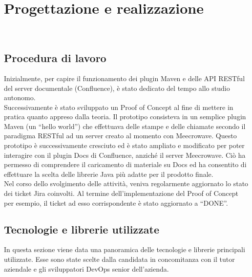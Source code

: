 
\chapter{Progettazione e realizzazione}
\label{cap:progettazione}

\\

\section{Procedura di lavoro}
Inizialmente, per capire il funzionamento dei plugin Maven e delle API RESTful del server documentale (Confluence), è stato dedicato del tempo allo studio autonomo. \\
Successivamente è stato sviluppato un Proof of Concept al fine di mettere in pratica quanto appreso dalla teoria. 
Il prototipo consisteva in un semplice plugin Maven (un ``hello world'') che effettuava delle stampe e delle chiamate secondo il paradigma RESTful ad un server creato al momento con Meecrowave.
Questo prototipo è successivamente cresciuto ed è stato ampliato e modificato per poter interagire con il plugin Docs di Confluence, anziché il server Meecrowave.
Ciò ha permesso di comprendere il caricamento di materiale su Docs ed ha consentito di effettuare la scelta delle librerie Java più adatte per il prodotto finale. \\
Nel corso dello svolgimento delle attività, veniva regolarmente aggiornato lo stato dei ticket Jira coinvolti.
Al termine dell'implementazione del Proof of Concept per esempio, il ticket ad esso corrispondente è stato aggiornato a ``DONE''.

\section{Tecnologie e librerie utilizzate}
\label{sec:tecnologie-strumenti}

In questa sezione viene data una panoramica delle tecnologie e librerie principali utilizzate.
Esse sono state scelte dalla candidata in concomitanza con il tutor aziendale e gli sviluppatori DevOps senior dell'azienda.


